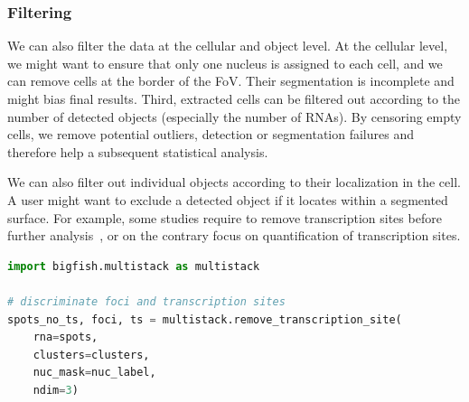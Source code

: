 \subsubsection{Filtering}
We can also filter the data at the cellular and object level. 
At the cellular level, we might want to ensure that only one nucleus is assigned to each cell, and we can remove cells at the border of the \ac{FoV}. 
Their segmentation is incomplete and might bias final results.
Third, extracted cells can be filtered out according to the number of detected objects (especially the number of \ac{RNA}s).
By censoring empty cells, we remove potential outliers, detection or segmentation failures and therefore help a subsequent statistical analysis.

We can also filter out individual objects according to their localization in the cell. 
A user might want to exclude a detected object if it locates within a segmented surface.
For example, some studies require to remove transcription sites before further analysis~\cite{CHOUAIB_2020}, or on the contrary focus on quantification of transcription sites.\\

\begin{minipage}{0.9\textwidth}
\begin{lstlisting}[language=Python]
import bigfish.multistack as multistack

# discriminate foci and transcription sites
spots_no_ts, foci, ts = multistack.remove_transcription_site(
    rna=spots,
    clusters=clusters,
    nuc_mask=nuc_label,
    ndim=3)
\end{lstlisting}
\end{minipage}








